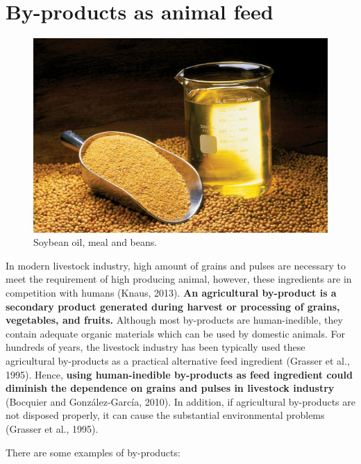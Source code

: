 \documentclass[]{book}
\begin{document}
\section{By-products as animal feed}\label{by-products-as-animal-feed}

\begin{figure}

{\centering \includegraphics[width=1\linewidth]{figures/sbm} 

}

\caption{Soybean oil, meal and beans.}\label{fig:sbm}
\end{figure}

In modern livestock industry, high amount of grains and pulses are
necessary to meet the requirement of high producing animal, however,
these ingredients are in competition with humans (Knaus, 2013).
\textbf{An agricultural by-product is a secondary product generated
during harvest or processing of grains, vegetables, and fruits.}
Although most by-products are human-inedible, they contain adequate
organic materials which can be used by domestic animals. For hundreds of
years, the livestock industry has been typically used these agricultural
by-products as a practical alternative feed ingredient (Grasser et al.,
1995). Hence, \textbf{using human-inedible by-products as feed
ingredient could diminish the dependence on grains and pulses in
livestock industry} (Bocquier and González-García, 2010). In addition,
if agricultural by-products are not disposed properly, it can cause the
substantial environmental problems (Grasser et al., 1995).

There are some examples of by-products:
\end{document}
